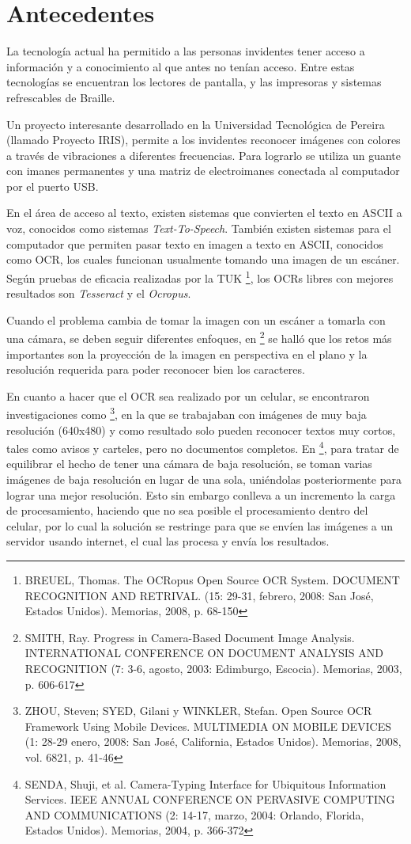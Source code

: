 \documentclass[a4paper, 11pt, oneside]{report}
\begin{document}
\section {Antecedentes}

La tecnología actual ha permitido a las personas invidentes tener acceso a información y a conocimiento al que antes no tenían acceso. Entre estas tecnologías se encuentran los lectores de pantalla, y las impresoras y sistemas refrescables de Braille.
	
Un proyecto interesante desarrollado en la Universidad Tecnológica de Pereira (llamado Proyecto IRIS), permite a los invidentes reconocer imágenes con colores a través de vibraciones a diferentes frecuencias. Para lograrlo se utiliza un guante con imanes permanentes y una matriz de electroimanes conectada al computador por el puerto USB.

En el área de acceso al texto, existen sistemas que convierten el texto en ASCII a voz, conocidos como sistemas \textit{Text-To-Speech}. También existen sistemas para el computador que permiten pasar texto en imagen a texto en ASCII, conocidos como OCR, los cuales funcionan usualmente tomando una imagen de un escáner. Según pruebas de eficacia realizadas por la TUK \footnote{BREUEL, Thomas. The OCRopus Open Source OCR System. DOCUMENT RECOGNITION AND RETRIVAL. (15: 29-31, febrero, 2008: San José, Estados Unidos). Memorias, 2008, p. 68-150}, los OCRs libres con mejores resultados son \textit{Tesseract} y el  \textit{Ocropus}. 

Cuando el problema cambia de tomar la imagen con un escáner a tomarla con una cámara, se deben seguir diferentes enfoques, en \footnote{SMITH, Ray. Progress in Camera-Based Document Image Analysis. INTERNATIONAL CONFERENCE ON DOCUMENT ANALYSIS AND RECOGNITION (7: 3-6, agosto, 2003: Edimburgo, Escocia). Memorias, 2003, p. 606-617} se halló que los retos más importantes son la proyección de la imagen en perspectiva en el plano y la  resolución requerida para poder reconocer bien los caracteres.

En cuanto a hacer que el OCR sea realizado por un celular, se encontraron investigaciones como \footnote{ZHOU, Steven; SYED, Gilani y WINKLER, Stefan. Open Source OCR Framework Using Mobile Devices. MULTIMEDIA ON MOBILE DEVICES (1: 28-29 enero, 2008: San José, California, Estados Unidos). Memorias, 2008, vol. 6821, p. 41-46}, en la que se trabajaban con imágenes de muy baja resolución (640x480) y como resultado solo pueden reconocer textos muy cortos, tales como avisos y carteles, pero no documentos completos. En \footnote{SENDA, Shuji, et al. Camera-Typing Interface for Ubiquitous Information Services. IEEE ANNUAL CONFERENCE ON PERVASIVE COMPUTING AND COMMUNICATIONS (2: 14-17, marzo, 2004: Orlando, Florida, Estados Unidos). Memorias, 2004, p. 366-372}, para tratar de equilibrar el hecho de tener una cámara de baja resolución, se toman varias imágenes de baja resolución en lugar de una sola, uniéndolas posteriormente para lograr una mejor resolución. Esto sin embargo conlleva a un incremento la carga de procesamiento, haciendo que no sea posible el procesamiento dentro del celular, por lo cual la solución se restringe para que se envíen las imágenes a un servidor usando internet, el cual las procesa y envía los resultados.
\end{document}
